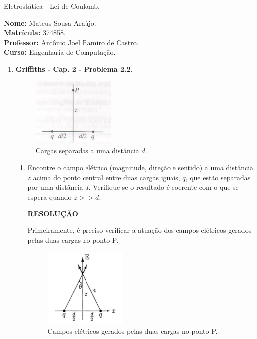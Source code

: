 \documentclass[11pt,a4paper]{article}
\begin{document}
	\begin{center}
		\Large Eletrostática - Lei de Coulomb. 
	\end{center}

\begin{flushleft}
\textbf{Nome:} Mateus Sousa Araújo. \\
\textbf{Matrícula:} 374858. \\
\textbf{Professor:} Antônio Joel Ramiro de Castro. \\
\textbf{Curso:} Engenharia de Computação. \\
\end{flushleft}

\begin{enumerate}

\item \textbf{Griffiths - Cap. 2 - Problema 2.2.}

\begin{figure}[h]	
\centering %
\includegraphics[width=4cm]{Selection_070.jpg} 
\caption{Cargas separadas a uma distância $d$.}
\end{figure}

\begin{enumerate}
\item Encontre o campo elétrico (magnitude, direção e sentido) a uma distância $z$ acima do ponto central entre duas cargas iguais, $q$, que estão separadas por uma distância $d$. Verifique se o resultado é coerente com o que se espera quando $z >> d$.

\textbf{RESOLUÇÃO}

Primeiramente, é preciso verificar a atuação dos campos elétricos gerados pelas duas cargas no ponto P. 

\begin{figure}[h]	
\centering %
\includegraphics[width=4cm]{Selection_073.jpg} 
\caption{Campos elétricos gerados pelas duas cargas no ponto P.}
\end{figure}


\end{enumerate}
\end{enumerate}
\end{document}
